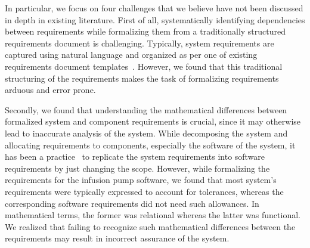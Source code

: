 %
%
%
%


%
In particular, we focus on four challenges that we believe have not been discussed in depth in existing literature. First of all, systematically identifying dependencies between requirements while formalizing them from a traditionally structured requirements document is challenging. Typically, system requirements are captured using natural language and organized as per one of existing requirements document templates~\cite{IEEE formats}. However, we found that this traditional structuring of the requirements makes the task of formalizing requirements arduous and error prone. 



Secondly, we found that understanding the mathematical differences between formalized system and component requirements is crucial, since it may otherwise lead to inaccurate analysis of the system. While decomposing the system and allocating requirements to components, especially the software of the system, it has been a practice~\cite{extending4variabe} to replicate the system requirements into software requirements by just changing the scope. However, while formalizing the requirements for the infusion pump software, we found that most system's requirements were typically expressed to account for tolerances, whereas the corresponding software requirements did not need such allowances. In mathematical terms, the former was relational whereas the latter was functional. We realized that failing to recognize such mathematical differences between the requirements may result in incorrect assurance of the system. %

